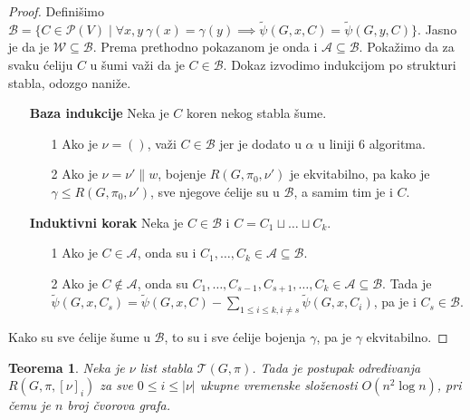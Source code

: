 \documentclass[12pt,oneside]{memoir}
\newtheorem{theorem}{Teorema}
\theoremstyle{definition}
\begin{document}
\begin{proof}
	  Definišimo $\mathcal{B} = \{C \in \mathcal{P}(V) \mid \forall x, y \
	  \gamma(x) = \gamma(y) \implies \widetilde{\psi}(G, x, C) = \widetilde{\psi}(G, y, C)\}$. Jasno je da je
	  $\mathcal{W} \subseteq \mathcal{B}$. Prema prethodno pokazanom je onda i
	  $\mathcal{A} \subseteq \mathcal{B}$.  Pokažimo da za svaku ćeliju $C$ u šumi važi
	  da je $C \in \mathcal{B}$. Dokaz izvodimo indukcijom po strukturi stabla,
	  odozgo naniže.

	  \begin{itemize}
		  \item[] \textbf{Baza indukcije} Neka je $C$ koren nekog stabla šume.
			  \begin{itemize}
				  \item[1\degree] Ako je $\nu = ()$, važi $C \in \mathcal{B}$ jer je
					  dodato u $\alpha$ u liniji 6 algoritma.
				  \item[2\degree] Ako je $\nu = \nu' \| w$, bojenje $R(G,
					  \pi_0, \nu')$ je ekvitabilno, pa kako je $\gamma \leq
					  R(G, \pi_0, \nu')$, sve njegove ćelije su u $\mathcal{B}$, a
					  samim tim je i $C$.
			  \end{itemize}
		  \item[] \textbf{Induktivni korak} Neka je $C \in \mathcal{B}$ i $C = C_1 \sqcup \dots \sqcup C_k$.
			  \begin{itemize}
				  \item[1\degree] Ako je $C \in \mathcal{A}$, onda su i $C_1, \dots,
					  C_k \in \mathcal{A} \subseteq \mathcal{B}$.
				  \item[2\degree] Ako je $C \not \in \mathcal{A}$, onda su $C_1,
					  \dots, C_{s-1}, C_{s+1}, \dots, C_k \in \mathcal{A} \subseteq
					  \mathcal{B}$. Tada je $\widetilde{\psi}(G, x, C_s) = \widetilde{\psi}(G, x, C) -
					  \sum_{1 \leq i \leq k, i \neq s} \widetilde{\psi}(G, x, C_i)$, pa je
					  i $C_s \in \mathcal{B}$.
			  \end{itemize}
	  \end{itemize}

	  Kako su sve ćelije šume u $\mathcal{B}$, to su i sve ćelije bojenja $\gamma$,
	  pa je $\gamma$ ekvitabilno.
  \end{proof}

  \begin{theorem}
	  Neka je $\nu$ list stabla $\mathcal{T}(G, \pi)$. Tada je postupak
	  određivanja $R(G, \pi, [\nu]_i)$ za sve $0 \leq i \leq |\nu|$ ukupne
	  vremenske složenosti $O(n^2 \log n)$, pri čemu je $n$ broj čvorova grafa.
  \end{theorem}
\end{document}
